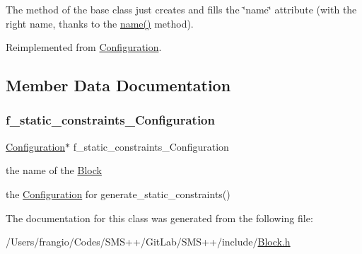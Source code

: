The method of the base class just creates and fills the \char`\"{}name\char`\"{} attribute (with the right name, thanks to the \mbox{\hyperlink{class_s_m_spp__di__unipi__it_1_1_configuration_a738e9dfd6e00507da219e4bd5a3f6be9}{name()}} method). 

Reimplemented from \mbox{\hyperlink{class_s_m_spp__di__unipi__it_1_1_configuration_a59f3f59d72c56028f06c555bdcd36caf}{Configuration}}.



\subsection{Member Data Documentation}
\mbox{\label{class_s_m_spp__di__unipi__it_1_1_block_config_ab496062cc113cfd83c7fbdcbaf2cb080}} 
\subsubsection{\texorpdfstring{f\+\_\+static\+\_\+constraints\+\_\+\+Configuration}{f\_static\_constraints\_Configuration}}
{\footnotesize\ttfamily \mbox{\hyperlink{class_s_m_spp__di__unipi__it_1_1_configuration}{Configuration}}$\ast$ f\+\_\+static\+\_\+constraints\+\_\+\+Configuration}



the name of the \mbox{\hyperlink{class_s_m_spp__di__unipi__it_1_1_block}{Block}} 

the \mbox{\hyperlink{class_s_m_spp__di__unipi__it_1_1_configuration}{Configuration}} for generate\+\_\+static\+\_\+constraints() 

The documentation for this class was generated from the following file\+:\begin{DoxyCompactItemize}
\item 
/\+Users/frangio/\+Codes/\+S\+M\+S++/\+Git\+Lab/\+S\+M\+S++/include/\mbox{\hyperlink{_block_8h}{Block.\+h}}\end{DoxyCompactItemize}
